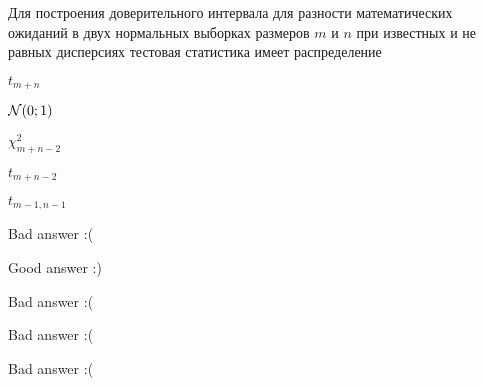 
\begin{question}
Для построения доверительного интервала для разности математических
ожиданий в двух нормальных выборках размеров \(m\) и \(n\) при известных
и не равных дисперсиях тестовая статистика имеет распределение
\begin{answerlist}
  \item \(t_{m+n}\)
  \item \(\mathcal{N}(0;1)\)
  \item \(\chi^2_{m+n-2}\)
  \item \(t_{m+n-2}\)
  \item \(t_{m-1,n-1}\)
\end{answerlist}
\end{question}

\begin{solution}
\begin{answerlist}
  \item Bad answer :(
  \item Good answer :)
  \item Bad answer :(
  \item Bad answer :(
  \item Bad answer :(
\end{answerlist}
\end{solution}

